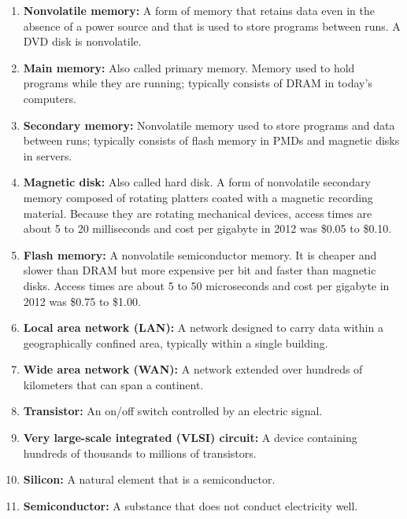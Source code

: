 \begin{enumerate}
    \item \textbf{Nonvolatile memory:} A form of memory that retains data even in the absence of a power source and that is used to store programs between runs. A DVD disk is nonvolatile.
    
    \item \textbf{Main memory:} Also called primary memory. Memory used to hold programs while they are running; typically consists of DRAM in today's computers.
    
    \item \textbf{Secondary memory:} Nonvolatile memory used to store programs and data between runs; typically consists of flash memory in PMDs and magnetic disks in servers.
    
    \item \textbf{Magnetic disk:} Also called hard disk. A form of nonvolatile secondary memory composed of rotating platters coated with a magnetic recording material. Because they are rotating mechanical devices, access times are about 5 to 20 milliseconds and cost per gigabyte in 2012 was \$0.05 to \$0.10.
    
    \item \textbf{Flash memory:} A nonvolatile semiconductor memory. It is cheaper and slower than DRAM but more expensive per bit and faster than magnetic disks. Access times are about 5 to 50 microseconds and cost per gigabyte in 2012 was \$0.75 to \$1.00.
    
    \item \textbf{Local area network (LAN):} A network designed to carry data within a geographically confined area, typically within a single building.
    
    \item \textbf{Wide area network (WAN):} A network extended over hundreds of kilometers that can span a continent.
    
    \item \textbf{Transistor:} An on/off switch controlled by an electric signal.
    
    \item \textbf{Very large-scale integrated (VLSI) circuit:} A device containing hundreds of thousands to millions of transistors.
    
    \item \textbf{Silicon:} A natural element that is a semiconductor.
    
    \item \textbf{Semiconductor:} A substance that does not conduct electricity well.
    

\end{enumerate}
